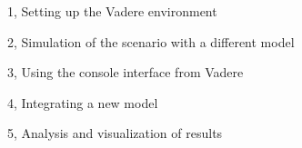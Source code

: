 \documentclass[10pt,a4paper]{article}
\begin{document}
\frontpage

\begin{task}{1, Setting up the Vadere environment}

\end{task}

\begin{task}{2, Simulation of the scenario with a different model}

\end{task}

\begin{task}{3, Using the console interface from Vadere}

\end{task}

\begin{task}{4, Integrating a new model}

\end{task}

\begin{task}{5, Analysis and visualization of results}

\end{task}



\end{document}
